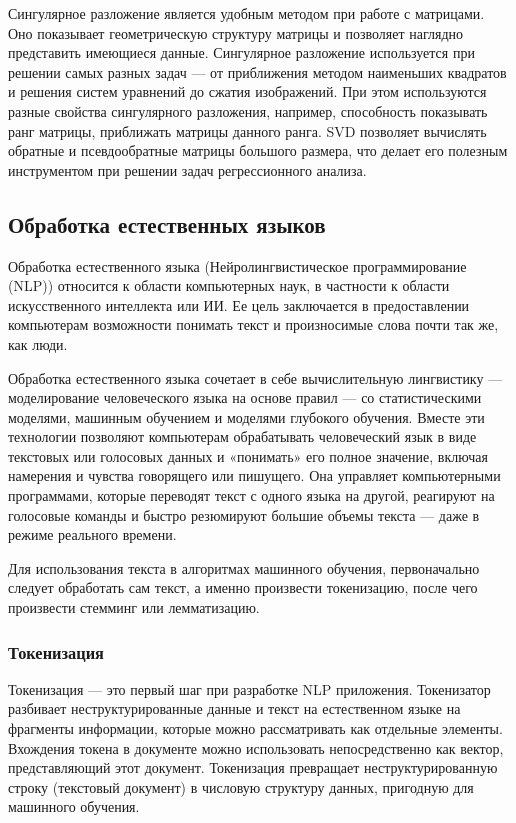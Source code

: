Сингулярное разложение является удобным методом при работе с матрицами. Оно показывает геометрическую структуру матрицы и позволяет наглядно представить имеющиеся данные. Сингулярное разложение используется при решении самых разных задач --- от приближения методом наименьших квадратов и решения систем уравнений до сжатия изображений. При этом используются разные свойства сингулярного разложения, например, способность показывать ранг матрицы, приближать матрицы данного ранга. SVD позволяет вычислять обратные и псевдообратные матрицы большого размера, что делает его полезным инструментом при решении задач регрессионного анализа.

\subsection{Обработка естественных языков}

Обработка естественного языка (Нейролингвистическое программирование (NLP)) относится к области компьютерных наук, в частности к области искусственного интеллекта или ИИ. Ее цель заключается в предоставлении компьютерам возможности понимать текст и произносимые слова почти так же, как люди.

Обработка естественного языка сочетает в себе вычислительную лингвистику --- моделирование человеческого языка на основе правил --- со статистическими моделями, машинным обучением и моделями глубокого обучения. Вместе эти технологии позволяют компьютерам обрабатывать человеческий язык в виде текстовых или голосовых данных и «понимать» его полное значение, включая намерения и чувства говорящего или пишущего. Она управляет компьютерными программами, которые переводят текст с одного языка на другой, реагируют на голосовые команды и быстро резюмируют большие объемы текста --- даже в режиме реального времени.

Для использования текста в алгоритмах машинного обучения, первоначально следует обработать сам текст, а именно произвести токенизацию, после чего произвести стемминг или лемматизацию.

\subsubsection{Токенизация}

Токенизация --- это первый шаг при разработке NLP приложения. Токенизатор разбивает неструктурированные данные и текст на естественном языке на фрагменты информации, которые можно рассматривать как отдельные элементы. Вхождения токена в документе можно использовать непосредственно как вектор, представляющий этот документ. Токенизация превращает неструктурированную строку (текстовый документ) в числовую структуру данных, пригодную для машинного обучения. 

